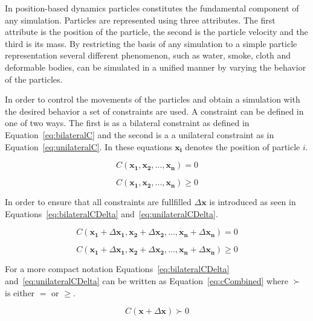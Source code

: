 In position-based dynamics particles constitutes the fundamental component of
any simulation.  Particles are represented using three attributes. The first
attribute is the position of the particle, the second is the particle velocity
and the third is its mass. By restricting the basis of any simulation to a
simple particle representation several different phenomenon, such as water,
smoke, cloth and deformable bodies, can be simulated in a unified manner by
varying the behavior of the particles.

In order to control the movements of the particles and obtain a simulation with
the desired behavior a set of constraints are used. A constraint can be defined
in one of two ways. The first is as a bilateral constraint as defined in
Equation~\ref{eq:bilateralC} and the second is a a unilateral constraint as in
Equation~\ref{eq:unilateralC}. In these equations $ \mathbf{x_{i}} $ denotes
the position of particle $ i $.

\begin{equation}
\label{eq:bilateralC}
C(\mathbf{x_{1}}, \mathbf{x_{2}}, ..., \mathbf{x_{n}}) = 0
\end{equation}

\begin{equation}
\label{eq:unilateralC}
C(\mathbf{x_{1}}, \mathbf{x_{2}}, ..., \mathbf{x_{n}}) \geq 0
\end{equation}

In order to ensure that all constraints are fullfilled $ \Delta \mathbf{x} $ is
introduced as seen in Equations~\ref{eq:bilateralCDelta} and~\ref{eq:unilateralCDelta}.

\begin{equation}
\label{eq:bilateralCDelta}
C(\mathbf{x_{1}} + \Delta \mathbf{x_{1}}, \mathbf{x_{2}} + \Delta \mathbf{x_{2}}, ..., \mathbf{x_{n}} + \Delta \mathbf{x_{n}}) = 0
\end{equation}

\begin{equation}
\label{eq:unilateralCDelta}
C(\mathbf{x_{1}} + \Delta \mathbf{x_{1}}, \mathbf{x_{2}} + \Delta \mathbf{x_{2}}, ..., \mathbf{x_{n}} + \Delta \mathbf{x_{n}}) \geq 0
\end{equation}

For a more compact notation Equations~\ref{eq:bilateralCDelta}
and~\ref{eq:unilateralCDelta} can be written as Equation~\ref{eq:cCombined}
where $ \succ $ is either $ = $ or $ \geq $.

\begin{equation}
\label{eq:cCombined}
C(\mathbf{x} + \Delta \mathbf{x}) \succ 0
\end{equation}

